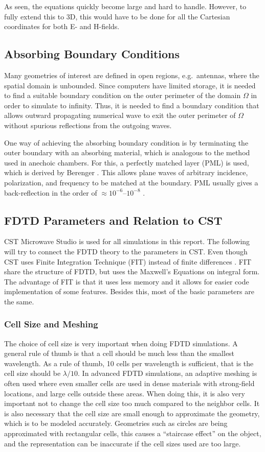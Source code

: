 As seen, the equations quickly become large and hard to handle. However, to fully extend this to 3D, this would have to be done for all the Cartesian coordinates for both E- and H-fields. 

\subsection{Absorbing Boundary Conditions}
Many geometries of interest are defined in open regions, e.g.\ antennas, where the spatial domain is unbounded. Since computers have limited storage, it is needed to find a suitable boundary condition on the outer perimeter of the domain $\Omega$ in order to simulate to infinity. Thus, it is needed to find a boundary condition that allows outward propagating numerical wave to exit the outer perimeter of $\Omega$ without spurious reflections from the outgoing waves. 

One way of achieving the absorbing boundary condition is by terminating the outer boundary with an absorbing material, which is analogous to the method used in anechoic chambers. For this, a perfectly matched layer (PML) is used, which is derived by Berenger \cite{taflove2000computional}. This allows plane waves of arbitrary incidence, polarization, and frequency to be matched at the boundary. PML usually gives a back-reflection in the order of $\approx 10^{-6}$--$10^{-8}$ \cite{taflove2000computional}.

\subsection{FDTD Parameters and Relation to CST}
CST Microwave Studio is used for all simulations in this report. The following will try to connect the FDTD theory to the parameters in CST. Even though CST uses Finite Integration Technique (FIT) instead of finite differences \cite{hirtenfelder2007}. FIT share the structure of FDTD, but uses the Maxwell's Equations on integral form. The advantage of FIT is that it uses less memory and it allows for easier code implementation of some features. Besides this, most of the basic parameters are the same. 

\subsubsection{Cell Size and Meshing}
The choice of cell size is very important when doing FDTD simulations. A general rule of thumb is that a cell should be much less than the smallest wavelength. As a rule of thumb, 10 cells per wavelength is sufficient, that is the cell size should be $\lambda/10$. In advanced FDTD simulations, an adaptive meshing is often used where even smaller cells are used in dense materials with strong-field locations, and large cells outside these areas. When doing this, it is also very important not to change the cell size too much compared to the neighbor cells. It is also necessary that the cell size are small enough to approximate the geometry, which is to be modeled accurately. Geometries such as circles are being approximated with rectangular cells, this causes a ``staircase effect'' on the object, and the representation can be inaccurate if the cell sizes used are too large. 

